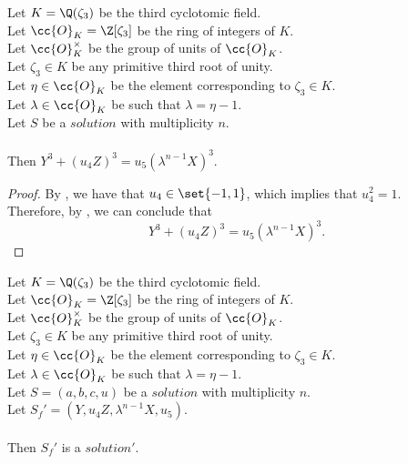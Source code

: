 \begin{lemma}
  \label{lmm:final}
  \leanok
  Let $K = \Q(\zeta_3)$ be the third cyclotomic field. \\
  Let $\cc{O}_K = \Z[\zeta_3]$ be the ring of integers of $K$. \\
  Let $\cc{O}^\times_K$ be the group of units of $\cc{O}_K$. \\
  Let $\zeta_3 \in K$ be any primitive third root of unity. \\
  Let $\eta \in \cc{O}_K$ be the element corresponding to $\zeta_3 \in K$. \\
  Let $\lambda \in \cc{O}_K$ be such that $\lambda = \eta -1$. \\
  Let $S$ be a $solution$ with multiplicity $n$.\\\\
  Then $Y^3 + (u_4 Z)^3 = u_5 (\lambda^{n-1} X)^3$.
\end{lemma}
\begin{proof}
  \leanok
  By , we have that $u_4 \in \set{-1,1}$, which implies that $u_4^2 = 1$.\\
  Therefore, by , we can conclude that
  $$Y^3 + (u_4 Z)^3 = u_5 (\lambda^{n-1} X)^3.$$
\end{proof}

\begin{definition}
  \label{def:Solution1_final}
  \leanok
  Let $K = \Q(\zeta_3)$ be the third cyclotomic field. \\
  Let $\cc{O}_K = \Z[\zeta_3]$ be the ring of integers of $K$. \\
  Let $\cc{O}^\times_K$ be the group of units of $\cc{O}_K$. \\
  Let $\zeta_3 \in K$ be any primitive third root of unity. \\
  Let $\eta \in \cc{O}_K$ be the element corresponding to $\zeta_3 \in K$. \\
  Let $\lambda \in \cc{O}_K$ be such that $\lambda = \eta -1$. \\
  Let $S = (a,b,c,u)$ be a $solution$ with multiplicity $n$.\\
  Let $S_f' = (Y,u_4 Z, \lambda^{n-1} X, u_5)$.\\\\
  Then $S_f'$ is a $solution'$.
\end{definition}

